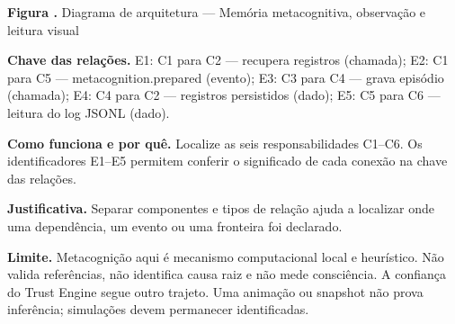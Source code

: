 {\small\textbf{Figura \thefigure.} Diagrama de arquitetura --- Memória metacognitiva, observação e leitura visual}\par\smallskip
{\footnotesize\textbf{Chave das relações.} E1: C1 para C2 --- recupera registros (chamada); E2: C1 para C5 --- metacognition.prepared (evento); E3: C3 para C4 --- grava episódio (chamada); E4: C4 para C2 --- registros persistidos (dado); E5: C5 para C6 --- leitura do log JSONL (dado).}\par\smallskip
\noindent\textbf{Como funciona e por quê.} Localize as seis responsabilidades C1--C6. Os identificadores E1--E5 permitem conferir o significado de cada conexão na chave das relações.\par
\noindent\textbf{Justificativa.} Separar componentes e tipos de relação ajuda a localizar onde uma dependência, um evento ou uma fronteira foi declarado.\par
\noindent\textbf{Limite.} Metacognição aqui é mecanismo computacional local e heurístico. Não valida referências, não identifica causa raiz e não mede consciência. A confiança do Trust Engine segue outro trajeto. Uma animação ou snapshot não prova inferência; simulações devem permanecer identificadas.\par\smallskip
{}
